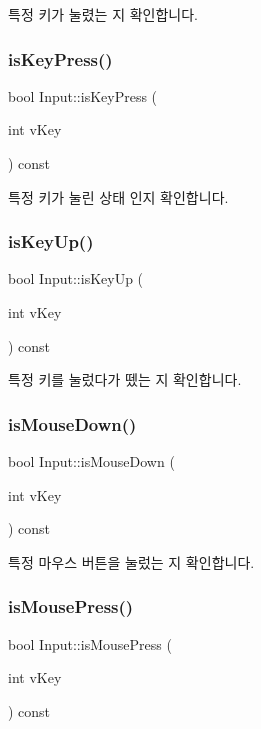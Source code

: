 특정 키가 눌렸는 지 확인합니다. \mbox{\label{class_input_a0ceb59370dc3a794ff26c2c5652fee97}} 
\subsubsection{\texorpdfstring{isKeyPress()}{isKeyPress()}}
{\footnotesize\ttfamily bool Input\+::is\+Key\+Press (\begin{DoxyParamCaption}\item[{int}]{v\+Key }\end{DoxyParamCaption}) const}

특정 키가 눌린 상태 인지 확인합니다. \mbox{\label{class_input_a7d505c2a0e149215daa3224b10b826b8}} 
\subsubsection{\texorpdfstring{isKeyUp()}{isKeyUp()}}
{\footnotesize\ttfamily bool Input\+::is\+Key\+Up (\begin{DoxyParamCaption}\item[{int}]{v\+Key }\end{DoxyParamCaption}) const}

특정 키를 눌렀다가 뗐는 지 확인합니다. \mbox{\label{class_input_ade50a28d9020824e82e20539b6d3a191}} 
\subsubsection{\texorpdfstring{isMouseDown()}{isMouseDown()}}
{\footnotesize\ttfamily bool Input\+::is\+Mouse\+Down (\begin{DoxyParamCaption}\item[{int}]{v\+Key }\end{DoxyParamCaption}) const}

특정 마우스 버튼을 눌렀는 지 확인합니다. \mbox{\label{class_input_ad066252083b8374a5fa9b583c4f02593}} 
\subsubsection{\texorpdfstring{isMousePress()}{isMousePress()}}
{\footnotesize\ttfamily bool Input\+::is\+Mouse\+Press (\begin{DoxyParamCaption}\item[{int}]{v\+Key }\end{DoxyParamCaption}) const}


